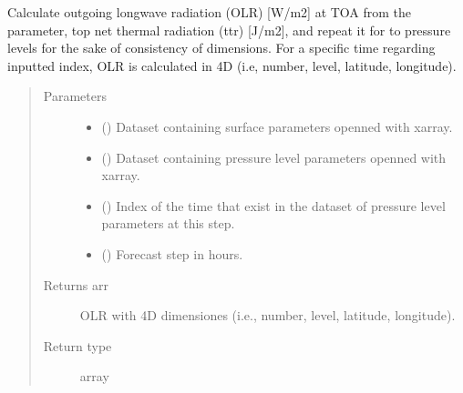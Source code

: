 \documentclass[a4paper,11pt,english]{sphinxmanual}
\begin{document}

\begin{fulllineitems}
\label{\detokenize{envlib:envlib.processing_surf_vars.extend_olr_pl_5d}}
Calculate outgoing longwave radiation (OLR) {[}W/m2{]} at TOA from the parameter, top net thermal radiation (ttr)
{[}J/m2{]}, and repeat it for to pressure levels for the sake of consistency of dimensions. For a specific time
regarding inputted index, OLR is calculated in 4D (i.e, number, level, latitude, longitude).
\begin{quote}\begin{description}
\item[{Parameters}] \leavevmode\begin{itemize}
\item {} 
 () \textendash{} Dataset containing surface parameters openned with xarray.

\item {} 
 () \textendash{} Dataset containing pressure level parameters openned with xarray.

\item {} 
 () \textendash{} Index of the time that exist in the dataset of pressure level parameters at this step.

\item {} 
 () \textendash{} Forecast step in hours.

\end{itemize}

\item[{Returns arr}] \leavevmode
OLR with 4D dimensiones (i.e., number, level, latitude, longitude).

\item[{Return type}] \leavevmode
array

\end{description}\end{quote}

\end{fulllineitems}
\end{document}
